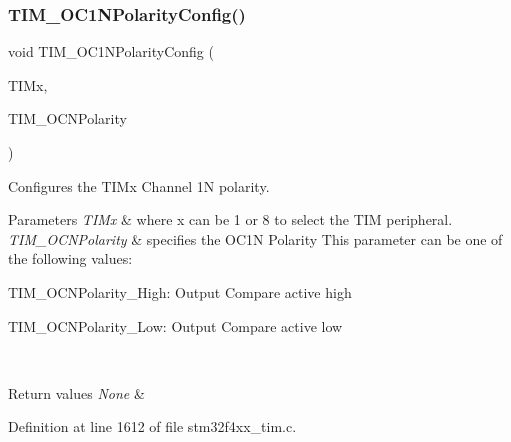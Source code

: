 \mbox{\label{group___t_i_m___group2_ga3cb91578e7dd34ea7d09862482960445}} 
\subsubsection{\texorpdfstring{T\+I\+M\+\_\+\+O\+C1\+N\+Polarity\+Config()}{TIM\_OC1NPolarityConfig()}}
{\footnotesize\ttfamily void T\+I\+M\+\_\+\+O\+C1\+N\+Polarity\+Config (\begin{DoxyParamCaption}\item[{\hyperlink{struct_t_i_m___type_def}{T\+I\+M\+\_\+\+Type\+Def} $\ast$}]{T\+I\+Mx,  }\item[{uint16\+\_\+t}]{T\+I\+M\+\_\+\+O\+C\+N\+Polarity }\end{DoxyParamCaption})}



Configures the T\+I\+Mx Channel 1N polarity. 


\begin{DoxyParams}{Parameters}
{\em T\+I\+Mx} & where x can be 1 or 8 to select the T\+IM peripheral. \\
\hline
{\em T\+I\+M\+\_\+\+O\+C\+N\+Polarity} & specifies the O\+C1N Polarity This parameter can be one of the following values\+: \begin{DoxyItemize}
\item T\+I\+M\+\_\+\+O\+C\+N\+Polarity\+\_\+\+High\+: Output Compare active high \item T\+I\+M\+\_\+\+O\+C\+N\+Polarity\+\_\+\+Low\+: Output Compare active low \end{DoxyItemize}
\\
\hline
\end{DoxyParams}

\begin{DoxyRetVals}{Return values}
{\em None} & \\
\hline
\end{DoxyRetVals}


Definition at line 1612 of file stm32f4xx\+\_\+tim.\+c.

\mbox{\label{group___t_i_m___group2_ga03878f78163485c8a3508cff2111c297}} 
